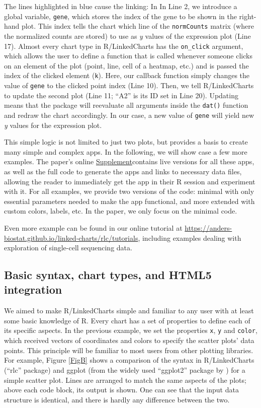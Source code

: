 \documentclass[twocolumn,10pt]{article}
\newcommand{\Supplement}{\href{https://anders-biostat.github.io/lc-paper/}{Supplement}}
\begin{document}
The lines highlighted in blue cause the linking: In In Line 2, we introduce a global variable, \texttt{gene}, which stores the index of the gene to be shown in the right-hand plot. This index tells the chart which line of the \texttt{normCounts} matrix (where the normalized counts are stored) to use as \emph{y} values of the expression plot (Line 17). Almost every chart type in R/LinkedCharts has the \texttt{on_click} argument, which allows the user to define a function that is called whenever someone clicks on an element of the plot (point, line, cell of a heatmap, etc.) and is passed the index of the clicked element (\texttt{k}).  Here, our callback function simply changes the value of \texttt{gene} to the clicked point index (Line 10). Then, we tell R/LinkedCharts to update the second plot (Line 11; ``A2'' is its ID set in Line 20). Updating means that the package will reevaluate all arguments inside the \texttt{dat()} function and redraw the chart accordingly. In our case, a new value of \texttt{gene} will yield new \emph{y} values for the expression plot.

This simple logic is not limited to just two plots, but provides a basis to create many simple and complex apps. In the following, we will show case a few more examples. The paper's online \Supplement contains live versions for all these apps, as well as the full code to generate the apps and links to necessary data files, allowing the reader to immediately get the app in their R session and experiment with it. For all examples, we provide two versions of the code: minimal with only essential parameters needed to make the app functional, and more extended with custom colors, labels, etc. In the paper, we only focus on the minimal code.

Even more example can be found in our online tutorial at \url{https://anders-biostat.github.io/linked-charts/rlc/tutorials}, including examples dealing with exploration of single-cell sequencing data.

\subsection{Basic syntax, chart types, and HTML5 integration}

We aimed to make R/LinkedCharts simple and familiar to any user with at least some basic knowledge of R. Every chart has a set of properties to define each of its specific aspects. In the previous example, we set the properties \texttt{x}, \texttt{y} and \texttt{color}, which received vectors of coordinates and colors to specify the scatter plots' data points. This principle will be familiar to most users from other plotting libraries. For example, Figure \ref{FigB} shows a comparison of the syntax in R/LinkedCharts (``rlc'' package) and ggplot (from the widely used ``ggplot2'' package by \citet{wickham_2016}) for a simple scatter plot. Lines are arranged to match the same aspects of the plots; above each code block, its output is shown. One can see that the input data structure is identical, and there is hardly any difference between the two.
\end{document}
